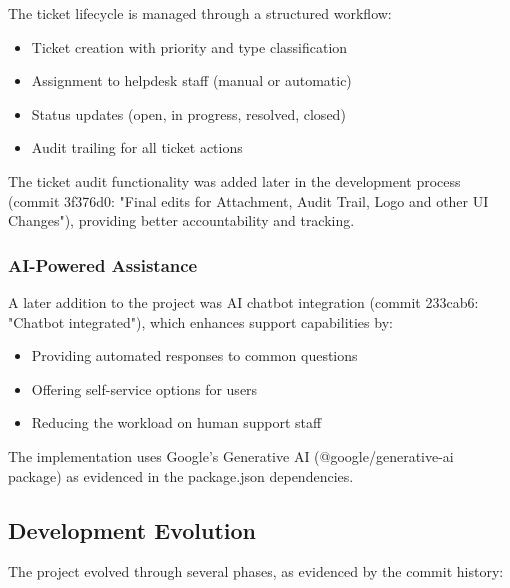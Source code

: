 \documentclass[12pt,a4paper]{article}
\begin{document}
The ticket lifecycle is managed through a structured workflow:

\begin{itemize}
    \item Ticket creation with priority and type classification
    \item Assignment to helpdesk staff (manual or automatic)
    \item Status updates (open, in progress, resolved, closed)
    \item Audit trailing for all ticket actions
\end{itemize}

The ticket audit functionality was added later in the development process (commit 3f376d0: "Final edits for Attachment, Audit Trail, Logo and other UI Changes"), providing better accountability and tracking.

\subsubsection{AI-Powered Assistance}

A later addition to the project was AI chatbot integration (commit 233cab6: "Chatbot integrated"), which enhances support capabilities by:

\begin{itemize}
    \item Providing automated responses to common questions
    \item Offering self-service options for users
    \item Reducing the workload on human support staff
\end{itemize}

The implementation uses Google's Generative AI (@google/generative-ai package) as evidenced in the package.json dependencies.

\subsection{Development Evolution}

The project evolved through several phases, as evidenced by the commit history:
\end{document}
